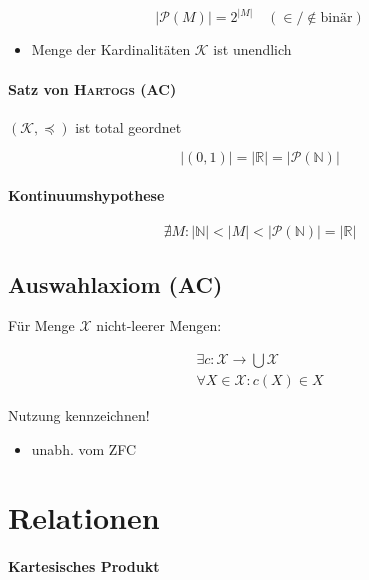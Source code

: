 $$|\mathcal{P}(M)| = 2^{|M|} \quad (\in / \notin \text{binär})$$

\begin{itemize}
  \item Menge der Kardinalitäten $\mathcal{K}$ ist unendlich
\end{itemize}

\paragraph{Satz von \textsc{Hartogs} (AC)}

$(\mathcal{K}, \preceq)$ ist total geordnet\

\mzBreak

$$|(0,1)| = |\mathbb{R}| = |\mathcal{P}(\mathbb{N})|$$

\paragraph{Kontinuumshypothese}

$$\nexists M: |\mathbb{N}| < |M| < |\mathcal{P}(\mathbb{N})| = |\mathbb{R}|$$

\subsection{Auswahlaxiom (AC)}

Für Menge $\mathcal{X}$ nicht-leerer Mengen:

\begin{gather*}
  \exists c: \mathcal{X} \rightarrow \bigcup \mathcal{X} \\
  \forall X \in \mathcal{X}: c(X) \in X
\end{gather*}

Nutzung kennzeichnen!

\begin{itemize}
  \item unabh. vom ZFC
\end{itemize}

\section{Relationen}

\paragraph{Kartesisches Produkt}

